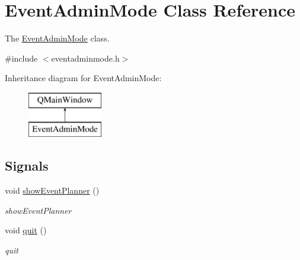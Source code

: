 \hypertarget{class_event_admin_mode}{}\section{Event\+Admin\+Mode Class Reference}
\label{class_event_admin_mode}


The \hyperlink{class_event_admin_mode}{Event\+Admin\+Mode} class.  




{\ttfamily \#include $<$eventadminmode.\+h$>$}

Inheritance diagram for Event\+Admin\+Mode\+:\begin{figure}[H]
\begin{center}
\leavevmode
\includegraphics[height=2.000000cm]{class_event_admin_mode}
\end{center}
\end{figure}
\subsection*{Signals}
\begin{DoxyCompactItemize}
\item 
void \hyperlink{class_event_admin_mode_aff26ca6ac01a61846ccef0e55cc274de}{show\+Event\+Planner} ()
\begin{DoxyCompactList}\small\item\em show\+Event\+Planner \end{DoxyCompactList}\item 
void \hyperlink{class_event_admin_mode_a5fcf257db5008a3f634c3fcd13f06994}{quit} ()
\begin{DoxyCompactList}\small\item\em quit \end{DoxyCompactList}\end{DoxyCompactItemize}
